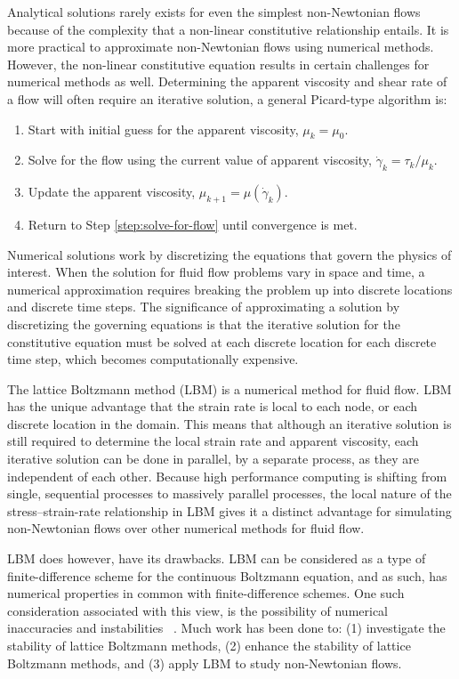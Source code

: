 \documentclass{article}
\begin{document}
Analytical solutions rarely exists for even the simplest non-Newtonian flows because of the complexity that a non-linear constitutive relationship entails.
It is more practical to approximate non-Newtonian flows using numerical methods.
However, the non-linear constitutive equation results in certain challenges for numerical methods as well.
Determining the apparent viscosity and shear rate of a flow will often require an iterative solution, a general Picard-type algorithm is:

\begin{enumerate}
	\item Start with initial guess for the apparent viscosity, $\mu_k = \mu_0$.
	\item \label{step:solve-for-flow} Solve for the flow using the current value of apparent viscosity, $\dot{\gamma}_k = \tau_k / \mu_k$.
	\item Update the apparent viscosity, $\mu_{k+1} = \mu(\dot{\gamma}_k)$.
	\item Return to Step \ref{step:solve-for-flow} until convergence is met.
\end{enumerate}

Numerical solutions work by discretizing the equations that govern the physics of interest.
When the solution for fluid flow problems vary in space and time, a numerical approximation requires breaking the problem up into discrete locations and discrete time steps.
The significance of approximating a solution by discretizing the governing equations is that the iterative solution for the constitutive equation must be solved at each discrete location for each discrete time step, which becomes computationally expensive.

The lattice Boltzmann method (LBM) is a numerical method for fluid flow.
LBM has the unique advantage that the strain rate is local to each node, or each discrete location in the domain.
This means that although an iterative solution is still required to determine the local strain rate and apparent viscosity, each iterative solution can be done in parallel, by a separate process, as they are independent of each other.
Because high performance computing is shifting from single, sequential processes to massively parallel processes, the local nature of the stress--strain-rate relationship in LBM gives it a distinct advantage for simulating non-Newtonian flows over other numerical methods for fluid flow. %

LBM does however, have its drawbacks.
LBM can be considered as a type of finite-difference scheme for the continuous Boltzmann equation, and as such, has numerical properties in common with finite-difference schemes. %
One such consideration associated with this view, is the possibility of numerical inaccuracies and instabilities ~\cite{sterling1993stability,sterling1996stability,bawazeer2013stability,lallemand2000theory}. %
Much work has been done to: (1) investigate the stability of lattice Boltzmann methods, (2) enhance the stability of lattice Boltzmann methods, and (3) apply LBM to study non-Newtonian flows.
\end{document}

